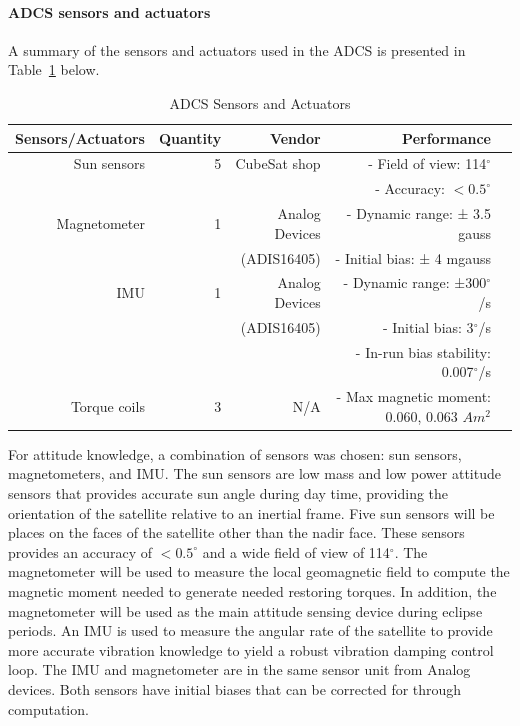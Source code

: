 \documentclass[12pt]{article}
\begin{document}
				\paragraph{ADCS sensors and actuators}
				A summary of the sensors and actuators used in the ADCS is presented in Table~\ref{tab:ADCS_sensors} below. 
\begin{table}[htbp]
  \centering
  \caption{ADCS Sensors and Actuators}
    \begin{tabular}{|r|r|r|r|r|}
    \hline
    \textbf{Sensors/Actuators} & \textbf{Quantity} & \textbf{Vendor} & \textbf{Performance}  &\bigstrut\\
    \hline
    Sun sensors & 5     & CubeSat shop & \multicolumn{1}{r}{- Field of view: 114$^\circ$} &  \bigstrut[t]\\
          &       &       & \multicolumn{1}{r}{- Accuracy: $< 0.5^\circ$} &  \bigstrut[b]\\
    \hline
    Magnetometer & 1     & Analog Devices  & \multicolumn{1}{r}{- Dynamic range: ± 3.5 gauss} &  \bigstrut[t]\\
          &       & (ADIS16405) & \multicolumn{1}{r}{- Initial bias: ± 4 mgauss} &  \bigstrut[b]\\
    \hline
    IMU   & 1     & Analog Devices  & \multicolumn{1}{r}{- Dynamic range: ±300$^\circ$/s} &  \bigstrut[t]\\
          &       & (ADIS16405) & \multicolumn{1}{r}{- Initial bias: 3$^\circ$/s} &  \\
          &       &       & \multicolumn{1}{r}{- In-run bias stability: 0.007$^\circ$/s} &  \bigstrut[b]\\
    \hline
    Torque coils & 3     & N/A   & \multicolumn{1}{r}{- Max magnetic moment: 0.060, 0.063 $Am^2$} &  \bigstrut\\
    \hline
    \end{tabular}%
  \label{tab:ADCS_sensors}%
\end{table}%

			For attitude knowledge, a combination of sensors was chosen: sun sensors, magnetometers, and IMU.  The sun sensors are low mass and low power attitude sensors that provides accurate sun angle during day time, providing the orientation of the satellite relative to an inertial frame. Five sun sensors will be places on the faces of the satellite other than the nadir face. These sensors provides an accuracy of $< 0.5^\circ$ and a wide field of view of 114$^\circ$. The magnetometer will be used to measure the local geomagnetic field to compute the magnetic moment needed to generate needed restoring torques. In addition, the magnetometer will be used as the main attitude sensing device during eclipse periods. An IMU is used to measure the angular rate of the satellite to provide more accurate vibration knowledge to yield a robust vibration damping control loop. The IMU and magnetometer are in the same sensor unit from Analog devices. Both sensors have initial biases that can be corrected for through computation. 
\end{document}
